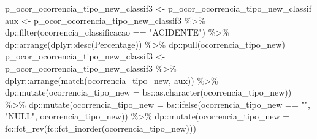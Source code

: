 \documentclass[
]{article}
\newenvironment{Shaded}{\begin{snugshade}}{\end{snugshade}}
\newcommand{\AttributeTok}[1]{\textcolor[rgb]{0.77,0.63,0.00}{#1}}
\newcommand{\FunctionTok}[1]{\textcolor[rgb]{0.00,0.00,0.00}{#1}}
\newcommand{\NormalTok}[1]{#1}
\newcommand{\OtherTok}[1]{\textcolor[rgb]{0.56,0.35,0.01}{#1}}
\newcommand{\SpecialCharTok}[1]{\textcolor[rgb]{0.00,0.00,0.00}{#1}}
\newcommand{\StringTok}[1]{\textcolor[rgb]{0.31,0.60,0.02}{#1}}
\begin{document}
\begin{Shaded}
\begin{Highlighting}[]
\NormalTok{p\_ocor\_ocorrencia\_tipo\_new\_classif3 }\OtherTok{\textless{}{-}}\NormalTok{ p\_ocor\_ocorrencia\_tipo\_new\_classif}
\NormalTok{aux }\OtherTok{\textless{}{-}}\NormalTok{ p\_ocor\_ocorrencia\_tipo\_new\_classif3 }\SpecialCharTok{\%\textgreater{}\%} 
\NormalTok{    dp}\SpecialCharTok{::}\FunctionTok{filter}\NormalTok{(}\StringTok{\textasciigrave{}}\AttributeTok{ocorrencia\_classificacao}\StringTok{\textasciigrave{}} \SpecialCharTok{==} \StringTok{"ACIDENTE"}\NormalTok{) }\SpecialCharTok{\%\textgreater{}\%} 
\NormalTok{    dp}\SpecialCharTok{::}\FunctionTok{arrange}\NormalTok{(dplyr}\SpecialCharTok{::}\FunctionTok{desc}\NormalTok{(}\StringTok{\textasciigrave{}}\AttributeTok{Percentage}\StringTok{\textasciigrave{}}\NormalTok{)) }\SpecialCharTok{\%\textgreater{}\%} 
\NormalTok{    dp}\SpecialCharTok{::}\FunctionTok{pull}\NormalTok{(ocorrencia\_tipo\_new)}
\NormalTok{p\_ocor\_ocorrencia\_tipo\_new\_classif3 }\OtherTok{\textless{}{-}}\NormalTok{ p\_ocor\_ocorrencia\_tipo\_new\_classif3 }\SpecialCharTok{\%\textgreater{}\%} 
\NormalTok{                    dplyr}\SpecialCharTok{::}\FunctionTok{arrange}\NormalTok{(}\FunctionTok{match}\NormalTok{(}\StringTok{\textasciigrave{}}\AttributeTok{ocorrencia\_tipo\_new}\StringTok{\textasciigrave{}}\NormalTok{, aux)) }\SpecialCharTok{\%\textgreater{}\%} 
\NormalTok{    dp}\SpecialCharTok{::}\FunctionTok{mutate}\NormalTok{(}\StringTok{\textasciigrave{}}\AttributeTok{ocorrencia\_tipo\_new}\StringTok{\textasciigrave{}} \OtherTok{=}\NormalTok{ bs}\SpecialCharTok{::}\FunctionTok{as.character}\NormalTok{(}\StringTok{\textasciigrave{}}\AttributeTok{ocorrencia\_tipo\_new}\StringTok{\textasciigrave{}}\NormalTok{)) }\SpecialCharTok{\%\textgreater{}\%} 
\NormalTok{    dp}\SpecialCharTok{::}\FunctionTok{mutate}\NormalTok{(}\StringTok{\textasciigrave{}}\AttributeTok{ocorrencia\_tipo\_new}\StringTok{\textasciigrave{}} \OtherTok{=}\NormalTok{ bs}\SpecialCharTok{::}\FunctionTok{ifelse}\NormalTok{(}\StringTok{\textasciigrave{}}\AttributeTok{ocorrencia\_tipo\_new}\StringTok{\textasciigrave{}} \SpecialCharTok{==} \StringTok{""}\NormalTok{, }\StringTok{"NULL"}\NormalTok{,}
                                             \StringTok{\textasciigrave{}}\AttributeTok{ocorrencia\_tipo\_new}\StringTok{\textasciigrave{}}\NormalTok{)) }\SpecialCharTok{\%\textgreater{}\%} 
\NormalTok{    dp}\SpecialCharTok{::}\FunctionTok{mutate}\NormalTok{(}\StringTok{\textasciigrave{}}\AttributeTok{ocorrencia\_tipo\_new}\StringTok{\textasciigrave{}} \OtherTok{=}\NormalTok{ fc}\SpecialCharTok{::}\FunctionTok{fct\_rev}\NormalTok{(fc}\SpecialCharTok{::}\FunctionTok{fct\_inorder}\NormalTok{(}\StringTok{\textasciigrave{}}\AttributeTok{ocorrencia\_tipo\_new}\StringTok{\textasciigrave{}}\NormalTok{)))}
    


\end{Highlighting}
\end{Shaded}
\end{document}
